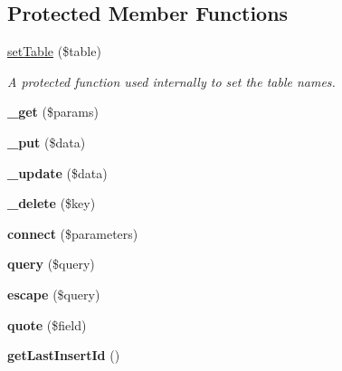 \subsection*{Protected Member Functions}
\begin{DoxyCompactItemize}
\item 
\hyperlink{class_sql_database_a932f083428617453b72784e6cda0d1ae}{setTable} (\$table)
\begin{DoxyCompactList}\small\item\em A protected function used internally to set the table names. \item\end{DoxyCompactList}\item 
\hypertarget{class_sql_database_aa46b4402476d18645948ef5f67b42ddc}{
{\bfseries \_\-get} (\$params)}
\label{class_sql_database_aa46b4402476d18645948ef5f67b42ddc}

\item 
\hypertarget{class_sql_database_a2b0c769a02dd5bb7de44c1c9e5fe224e}{
{\bfseries \_\-put} (\$data)}
\label{class_sql_database_a2b0c769a02dd5bb7de44c1c9e5fe224e}

\item 
\hypertarget{class_sql_database_aefc7ba320935063086d4fa1822aa9d5c}{
{\bfseries \_\-update} (\$data)}
\label{class_sql_database_aefc7ba320935063086d4fa1822aa9d5c}

\item 
\hypertarget{class_sql_database_aca2b0969789190aaf99e56d10c49d517}{
{\bfseries \_\-delete} (\$key)}
\label{class_sql_database_aca2b0969789190aaf99e56d10c49d517}

\item 
\hypertarget{class_sql_database_aba2c3659ee9b32b24deb516e31bf13a5}{
{\bfseries connect} (\$parameters)}
\label{class_sql_database_aba2c3659ee9b32b24deb516e31bf13a5}

\item 
\hypertarget{class_sql_database_ab1027b7051eba9c9fdbe98a5d6273b21}{
{\bfseries query} (\$query)}
\label{class_sql_database_ab1027b7051eba9c9fdbe98a5d6273b21}

\item 
\hypertarget{class_sql_database_afacfc91d4953efb660f1d9019c849047}{
{\bfseries escape} (\$query)}
\label{class_sql_database_afacfc91d4953efb660f1d9019c849047}

\item 
\hypertarget{class_sql_database_ae0435bd0786848e7fb9ee4ac03b12736}{
{\bfseries quote} (\$field)}
\label{class_sql_database_ae0435bd0786848e7fb9ee4ac03b12736}

\item 
\hypertarget{class_sql_database_ad98a281e86e4d6f7d057425d0e614f5a}{
{\bfseries getLastInsertId} ()}
\label{class_sql_database_ad98a281e86e4d6f7d057425d0e614f5a}

\end{DoxyCompactItemize}
